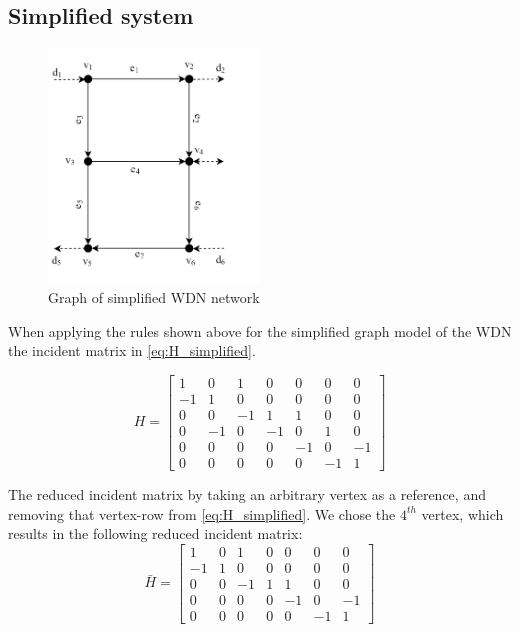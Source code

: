 \subsection{Simplified system}
\begin{figure}[h!]
	\centering
	\includegraphics[width=0.5\textwidth]{Pictures/Graph.png}
	\caption{Graph of simplified WDN network \cite{Rathore930}}
	\label{fig:graph}
\end{figure}

When applying the rules shown above for the simplified graph model of the WDN the incident matrix in \cref{eq:H_simplified}.

\begin{equation}
	H = \begin{bmatrix}
		1 & 0 & 1 & 0 & 0 & 0 & 0\\
		-1 & 1 & 0 & 0 & 0 & 0 & 0\\
		0 & 0 & -1 & 1 & 1 & 0 & 0\\
		0 & -1 & 0 & -1 & 0 & 1 & 0\\
		0 & 0 & 0 & 0 & -1 &  0  & -1\\
		0 & 0 & 0 & 0 & 0 & -1 & 1
	\end{bmatrix}
	\label{eq:H_simplified}
\end{equation} %


The reduced incident matrix by taking an arbitrary vertex as a reference, and removing that vertex-row from \cref{eq:H_simplified}. We chose the $4^{th}$ vertex, which results in the following reduced incident matrix:
\begin{equation}
	\bar{H} = \begin{bmatrix}
		1 & 0 & 1 & 0 & 0 & 0 & 0\\
		-1 & 1 & 0 & 0 & 0 & 0 & 0\\
		0 & 0 & -1 & 1 & 1 & 0 & 0\\
		0 & 0 & 0 & 0 & -1 &  0  & -1\\
		0 & 0 & 0 & 0 & 0 & -1 & 1
	\end{bmatrix}
\end{equation}

